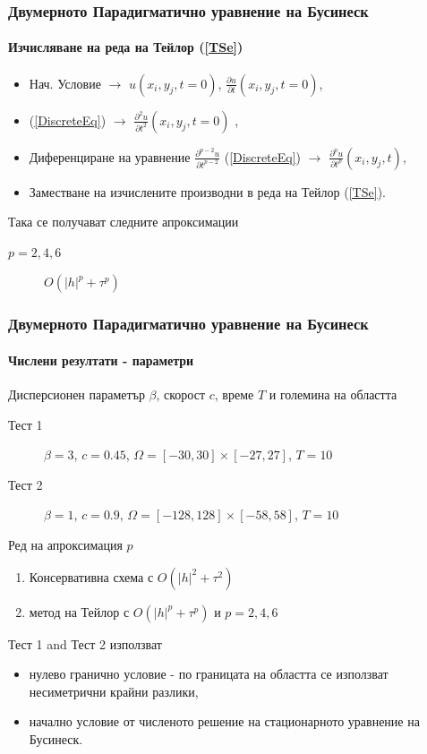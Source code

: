 \documentclass{beamer}
\newcommand{\rf}[1]{(\ref{#1})}
\begin{document}
\begin{frame}
\frametitle{Двумерното Парадигматично уравнение на Бусинеск}
\framesubtitle{Изчисляване на реда на Тейлор \rf{TSe}}
\begin{itemize}
 \item Нач. Условие $\rightarrow$ $u(x_i, y_j, t=0)$, $\frac{ \partial u }{ \partial t }(x_i, y_j, t=0)$,
 \item \rf{DiscreteEq} $\rightarrow$ $\frac{ \partial^2 u }{ \partial t^2 }(x_i, y_j, t=0)$ ,
 \item Диференциране на уравнение $\frac{ \partial^{p-2} u }{ \partial t^{p-2} }$ \rf{DiscreteEq} $\rightarrow$  $\frac{ \partial^p u }{ \partial t^p }(x_i, y_j, t)$,
 \item Заместване на изчислените производни в реда на Тейлор \rf{TSe}.
\end{itemize}


Така се получават следните апроксимации
\begin{description}
 \item[$p=2,4,6$] $O(|h|^p + \tau^p)$
\end{description}

\end{frame}

\begin{frame}
\frametitle{Двумерното Парадигматично уравнение на Бусинеск}
\framesubtitle{Числени резултати - параметри}

Дисперсионен параметър $\beta$, скорост $c$, време $T$ и големина на областта
\begin{description}
 \item[Тест 1] $\beta = 3$, $c = 0.45$, $\Omega = [-30, 30] \times [-27, 27]$, $T = 10$
 \item[Тест 2] $\beta = 1$, $c = 0.9$, $\Omega = [-128, 128] \times [-58, 58]$, $T = 10$
\end{description}

Ред на апроксимация $p$
\begin{enumerate}
  \item Консервативна схема с $O(|h|^2 + \tau^2)$
  \item метод на Тейлор с $O(|h|^p + \tau^p)$ и $p = 2, 4, 6$
\end{enumerate}

Тест 1 and Тест 2 използват 
\begin{itemize} 
\item нулево гранично условие - по границата на областта се използват несиметрични крайни разлики,
\item начално условие от численото решение на стационарното уравнение на Бусинеск.
\end{itemize}
\end{frame}
\end{document}
